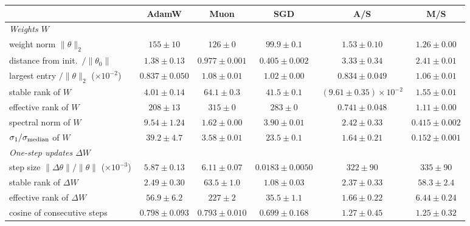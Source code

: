 \begin{center}\small\begin{minipage}{\linewidth}\centering
\captionsetup{type=table}
\caption{The metrics of \cref{tab:app-am} at training loss 0.97, with SGD as a reference: ratios AdamW/SGD and
Muon/SGD. Bold: in each ratio column, the five ratios farthest from 1 whose range excludes 1.}
\label{tab:app-sgd}
\footnotesize\setlength{\tabcolsep}{2.5pt}\setlength{\aboverulesep}{0pt}\setlength{\belowrulesep}{0pt}%
\renewcommand{\arraystretch}{1.15}%
\begin{tabular}{@{}l|ccc|cc@{}}
 & AdamW & Muon & SGD & A/S & M/S \\
\midrule
\emph{Weights $W$} & & & & & \\
weight norm $\|\theta\|_2$ & $155 \pm 10$ & $126 \pm 0$ & $99.9 \pm 0.1$ & $1.53 \pm 0.10$ & $1.26 \pm 0.00$ \\
distance from init.\ $/\|\theta_0\|$ & $1.38 \pm 0.13$ & $0.977 \pm 0.001$ & $0.405 \pm 0.002$ & $3.33 \pm 0.34$ & $2.41 \pm 0.01$ \\
largest entry $/\|\theta\|_2$ ($\times10^{-2}$) & $0.837 \pm 0.050$ & $1.08 \pm 0.01$ & $1.02 \pm 0.00$ & $0.834 \pm 0.049$ & $1.06 \pm 0.01$ \\
stable rank of $W$ & $4.01 \pm 0.14$ & $64.1 \pm 0.3$ & $41.5 \pm 0.1$ & {\boldmath\textbf{$(9.61 \pm 0.35){\times}10^{-2}$}} & $1.55 \pm 0.01$ \\
effective rank of $W$ & $208 \pm 13$ & $315 \pm 0$ & $283 \pm 0$ & $0.741 \pm 0.048$ & $1.11 \pm 0.00$ \\
spectral norm of $W$ & $9.54 \pm 1.24$ & $1.62 \pm 0.00$ & $3.90 \pm 0.01$ & $2.42 \pm 0.33$ & $0.415 \pm 0.002$ \\
$\sigma_1/\sigma_{\rm median}$ of $W$ & $39.2 \pm 4.7$ & $3.58 \pm 0.01$ & $23.5 \pm 0.1$ & $1.64 \pm 0.21$ & $0.152 \pm 0.001$ \\
\emph{One-step updates $\Delta W$} & & & & & \\
step size $\|\Delta\theta\|/\|\theta\|$ ($\times10^{-3}$) & $5.87 \pm 0.13$ & $6.11 \pm 0.07$ & $0.0183 \pm 0.0050$ & {\boldmath\textbf{$322 \pm 90$}} & {\boldmath\textbf{$335 \pm 90$}} \\
stable rank of $\Delta W$ & $2.49 \pm 0.30$ & $63.5 \pm 1.0$ & $1.08 \pm 0.03$ & $2.37 \pm 0.33$ & {\boldmath\textbf{$58.3 \pm 2.4$}} \\
effective rank of $\Delta W$ & $56.9 \pm 6.2$ & $227 \pm 2$ & $35.5 \pm 1.1$ & $1.66 \pm 0.22$ & $6.44 \pm 0.24$ \\
cosine of consecutive steps & $0.798 \pm 0.093$ & $0.793 \pm 0.010$ & $0.699 \pm 0.168$ & $1.27 \pm 0.45$ & $1.25 \pm 0.32$ \\

\end{tabular}
\end{minipage}
\end{center}
